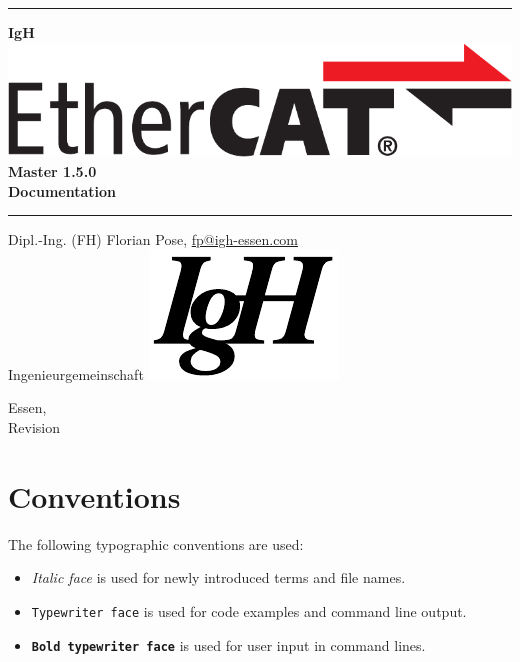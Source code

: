 \documentclass[a4paper,12pt,BCOR6mm,bibtotoc,idxtotoc]{scrbook}
\makeatletter
\renewcommand*{\lstlistoflistings}{%
  \begingroup
    \if@twocolumn
      \@restonecoltrue\onecolumn
    \else
      \@restonecolfalse
    \fi
    \lol@heading
    \setlength{\parskip}{\z@}%
    \setlength{\parindent}{\z@}%
    \setlength{\parfillskip}{\z@ \@plus 1fil}%
    \@starttoc{lol}%
    \if@restonecol\twocolumn\fi
  \endgroup
}
\newcommand{\IgH}{\raisebox{-0.7667ex}
  {\includegraphics[height=2.2ex]{images/ighsign}}}
\newcommand{\masterversion}{1.5.0}
\makeatother
\begin{document}
\pagestyle{empty}

\begin{titlepage}
  \begin{center}
    \rule{\textwidth}{1.5mm}

    {\Huge\sf\textbf{IgH \includegraphics[height=2.4ex]{images/ethercat}
      Master \masterversion}\\[1ex]
      \textbf{Documentation}}

    \vspace{1ex}
    \rule{\textwidth}{1.5mm}

    \vspace{\fill} {\Large Dipl.-Ing. (FH) Florian Pose,
    \url{fp@igh-essen.com}\\[1ex] Ingenieurgemeinschaft \IgH}

    \vspace{\fill}
    {\Large Essen, \rcsInfoLongDate\\[1ex]
      Revision \rcsInfoRevision}
  \end{center}
\end{titlepage}


\pagestyle{scrplain}

\tableofcontents
\listoftables
\listoffigures


\newpage
\pagestyle{scrheadings}

\section*{Conventions}

The following typographic conventions are used:

\begin{itemize}

\item \textit{Italic face} is used for newly introduced terms and file names.

\item \texttt{Typewriter face} is used for code examples and command line
output.

\item \texttt{\textbf{Bold typewriter face}} is used for user input in command
lines.

\end{itemize}
\end{document}
